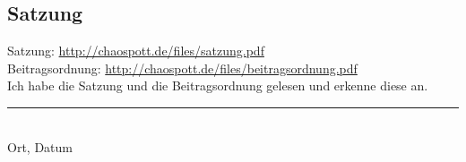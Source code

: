 \begin{Form}
\section*{Satzung}
Satzung: \url{http://chaospott.de/files/satzung.pdf}\\
Beitragsordnung: \url{http://chaospott.de/files/beitragsordnung.pdf}\\[3mm]
\CheckBox[name=12,bordercolor=black]{} Ich habe die Satzung und die Beitragsordnung gelesen und erkenne diese an.\\[1.2cm]


\noindent\rule{6cm}{0.4pt}
\tab{\noindent\rule{6cm}{0.4pt}}\\
Ort, Datum
\end{Form}

